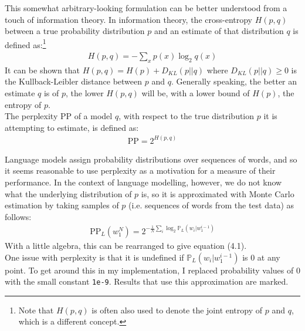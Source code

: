 \documentclass[a4paper, 12pt]{report}
\newcommand{\ttt}[1]{\texttt{#1}}
\begin{document}
This somewhat arbitrary-looking formulation can be better understood from a touch of information theory. In information theory, the cross-entropy $H(p, q)$ between a true probability distribution $p$ and an estimate of that distribution $q$ is defined as:\footnote{Note that $H(p, q)$ is often also used to denote the joint entropy of $p$ and $q$, which is a different concept.}
\begin{gather*}
	H(p, q) = -\sum_x p(x) \log_2 q(x)
\end{gather*}
It can be shown that $H(p, q) = H(p) + D_{KL}(p || q)$ where $D_{KL}(p || q) \geq 0$ is the Kullback-Leibler distance between $p$ and $q$. Generally speaking, the better an estimate $q$ is of $p$, the lower $H(p, q)$ will be, with a lower bound of $H(p)$, the entropy of $p$. \\

The perplexity PP of a model $q$, with respect to the true distribution $p$ it is attempting to estimate, is defined as:
\begin{gather}
	\text{PP} = 2^{H(p, q)}
\end{gather}

Language models assign probability distributions over sequences of words, and so it seems reasonable to use perplexity as a motivation for a measure of their performance. In the context of language modelling, however, we do not know what the underlying distribution of $p$ is, so it is approximated with Monte Carlo estimation by taking samples of $p$ (i.e. sequences of words from the test data) as follows:
\begin{gather*}
	\text{PP}_L(w_1^N) = 2^{-\frac{1}{N}\sum_i \log_2 \mathbb{P}_L(w_i | w_1^{i-1})}
\end{gather*}
With a little algebra, this can be rearranged to give equation (4.1). \\

One issue with perplexity is that it is undefined if $\mathbb{P}_L(w_i | w_1^{i-1})$ is 0 at any point. To get around this in my implementation, I replaced probability values of 0 with the small constant \ttt{1e-9}. Results that use this approximation are marked.
\end{document}
